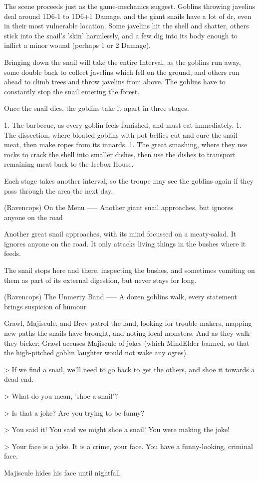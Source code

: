 The scene proceeds just as the game-mechanics suggest.
Goblins throwing javelins deal around 1D6-1 to 1D6+1 Damage, and the giant snails have a lot of \gls{dr}, even in their most vulnerable location.
Some javelins hit the shell and shatter, others stick into the snail's 'skin' harmlessly, and a few dig into its body enough to inflict a minor wound (perhaps 1 or 2 Damage).

Bringing down the snail will take the entire Interval, as the goblins run away, some double back to collect javelins which fell on the ground, and others run ahead to climb trees and throw javelins from above.
The goblins have to constantly stop the snail entering the forest.

Once the snail dies,
the goblins take it apart in three stages.

1. The barbecue, as every goblin feels famished, and must eat immediately.
1. The dissection, where bloated goblins with pot-bellies cut and cure the snail-meat, then make ropes from its innards.
1. The great smashing, where they use rocks to crack the shell into smaller dishes, then use the dishes to transport remaining meat back to the Icebox House.

Each stage takes another \gls{interval}, so the troupe may see the goblins again if they pass through the area the next day.

(Ravencops) On the Menu
-----
{Another giant snail approaches, but ignores anyone on the road}

Another great snail approaches, with its mind focussed on a meaty-salad.
It ignores anyone on the road.
It only attacks living things in the bushes where it feeds.

The snail stops here and there, inspecting the bushes, and sometimes vomiting on them as part of its external digestion, but never stays for long.


(Ravencops) The Unmerry Band
-----
{A dozen goblins walk, every statement brings suspicion of humour}

Grawl, Majiscule, and Brev patrol the land, looking for trouble-makers, mapping new paths the snails have brought, and noting local monsters.
And as they walk they bicker; Grawl accuses Majiscule of jokes (which MindElder banned, so that the high-pitched goblin laughter would not wake any ogres).

> If we find a snail, we'll need to go back to get the others, and shoe it towards a dead-end.

> What do you mean, 'shoe a snail'?

> Is that a joke?  Are you trying to be funny?

> You said it!  You said we might shoe a snail!  You were making the joke!

> Your face is a joke.  It is a crime, your face.  You have a funny-looking, criminal face.

Majiscule hides his face until nightfall.
